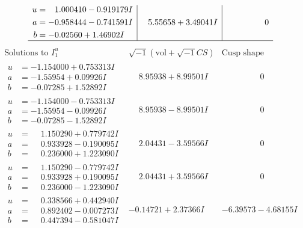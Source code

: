 \documentclass[1p]{elsarticle_modified}
\theoremstyle{definition}
\newcommand{\I}{\sqrt{-1}}
\begin{document}
$$\begin{array}{c|c|c}
\begin{aligned}
u &= \phantom{-}1.000410 - 0.919179 I \\
a &= -0.958444 - 0.741591 I \\
b &= -0.02560 + 1.46902 I\end{aligned}
 & \phantom{-}5.55658 + 3.49041 I & \phantom{-0.000000 } 0\\
 \hline 
 \end{array}$$\newpage$$\begin{array}{c|c|c}  
\text{Solutions to }I^u_{1}& \I (\text{vol} + \sqrt{-1}CS) & \text{Cusp shape}\\
 \hline 
\begin{aligned}
u &= -1.154000 + 0.753313 I \\
a &= -1.55954 + 0.09926 I \\
b &= -0.07285 + 1.52892 I\end{aligned}
 & \phantom{-}8.95938 + 8.99501 I & \phantom{-0.000000 } 0 \\ \hline\begin{aligned}
u &= -1.154000 - 0.753313 I \\
a &= -1.55954 - 0.09926 I \\
b &= -0.07285 - 1.52892 I\end{aligned}
 & \phantom{-}8.95938 - 8.99501 I & \phantom{-0.000000 } 0 \\ \hline\begin{aligned}
u &= \phantom{-}1.150290 + 0.779742 I \\
a &= \phantom{-}0.933928 - 0.190095 I \\
b &= \phantom{-}0.236000 + 1.223090 I\end{aligned}
 & \phantom{-}2.04431 - 3.59566 I & \phantom{-0.000000 } 0 \\ \hline\begin{aligned}
u &= \phantom{-}1.150290 - 0.779742 I \\
a &= \phantom{-}0.933928 + 0.190095 I \\
b &= \phantom{-}0.236000 - 1.223090 I\end{aligned}
 & \phantom{-}2.04431 + 3.59566 I & \phantom{-0.000000 } 0 \\ \hline\begin{aligned}
u &= \phantom{-}0.338566 + 0.442940 I \\
a &= \phantom{-}0.892402 - 0.007273 I \\
b &= \phantom{-}0.447394 - 0.581047 I\end{aligned}
 & -0.14721 + 2.37366 I & -6.39573 - 4.68155 I \\ \hline\begin{aligned}

\end{aligned}
\end{array}$$
\end{document}
